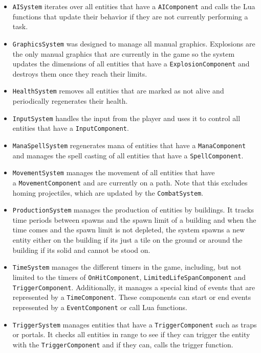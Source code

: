 \begin{itemize}
    \item \texttt{AISystem} iterates over all entities that have a \texttt{AIComponent} and calls the Lua functions that update
        their behavior if they are not currently performing a task.
    \item \texttt{GraphicsSystem} was designed to manage all manual graphics. Explosions are the only manual graphics that are
        currently in the game so the system updates the dimensions of all entities that have a \texttt{ExplosionComponent} and destroys
        them once they reach their limits.
    \item \texttt{HealthSystem} removes all entities that are marked as not alive and periodically regenerates their health.
    \item \texttt{InputSystem} handles the input from the player and uses it to control all entities that have a \texttt{InputComponent}.
    \item \texttt{ManaSpellSystem} regenerates mana of entities that have a \texttt{ManaComponent} and manages the spell casting of
        all entities that have a \texttt{SpellComponent}.
    \item \texttt{MovementSystem} manages the movement of all entities that have \\ a \texttt{MovementComponent} and are currently on a path.
        Note that this excludes homing projectiles, which are updated by the \texttt{CombatSystem}.
    \item \texttt{ProductionSystem} manages the production of entities by buildings. It tracks time periods between spawns and the spawn
        limit of a building and when the time comes and the spawn limit is not depleted, the system spawns a new entity
        either on the building if its just a tile on the ground or around the building if its solid and cannot be stood on.
    \item \texttt{TimeSystem} manages the different timers in the game, including, but not limited to the timers of \texttt{OnHitComponent},
        \texttt{LimitedLifeSpanComponent} and \texttt{TriggerComponent}. Additionally, it manages a special kind of events that are
        represented by a \texttt{TimeComponent}. These components can start or end events represented by a \texttt{EventComponent} or
        call Lua functions.
    \item \texttt{TriggerSystem} manages entities that have a \texttt{TriggerComponent} such as traps or portals. It checks all entities in
        range to see if they can trigger the entity with the \texttt{TriggerComponent} and if they can, calls the trigger function.
\end{itemize}

